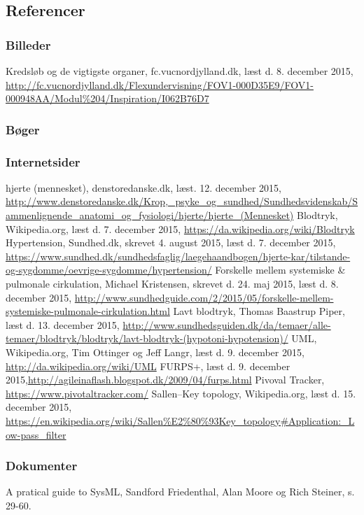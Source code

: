 \begin{thebibliography}{99}
\section{Referencer}
\subsubsection{Billeder}
Kredsløb og de vigtigste organer, fc.vucnordjylland.dk, læst d. 8. december 2015, \url{http://fc.vucnordjylland.dk/Flexundervisning/FOV1-000D35E9/FOV1-000948AA/Modul\%204/Inspiration/I062B76D7}
\subsubsection{Bøger}

\subsubsection{Internetsider}
hjerte (mennesket), denstoredanske.dk, læst. 12. december 2015, \url{http://www.denstoredanske.dk/Krop,_psyke_og_sundhed/Sundhedsvidenskab/Sammenlignende_anatomi_og_fysiologi/hjerte/hjerte_(Mennesket)}
Blodtryk, Wikipedia.org, læst d. 7. december 2015, \url{https://da.wikipedia.org/wiki/Blodtryk}
Hypertension, Sundhed.dk, skrevet 4. august 2015, læst d. 7. december 2015,
\url{https://www.sundhed.dk/sundhedsfaglig/laegehaandbogen/hjerte-kar/tilstande-og-sygdomme/oevrige-sygdomme/hypertension/}
Forskelle mellem systemiske \& pulmonale cirkulation, Michael Kristensen, skrevet d. 24. maj 2015, læst d. 8. december 2015, \url{http://www.sundhedguide.com/2/2015/05/forskelle-mellem-systemiske-pulmonale-cirkulation.html}
Lavt blodtryk, Thomas Baastrup Piper, læst d. 13. december 2015, \url{http://www.sundhedsguiden.dk/da/temaer/alle-temaer/blodtryk/blodtryk/lavt-blodtryk-(hypotoni-hypotension)/}
UML, Wikipedia.org, Tim Ottinger og Jeff Langr, læst d. 9. december 2015, \url{http://da.wikipedia.org/wiki/UML}
FURPS+, læst d. 9. december 2015,\url{http://agileinaflash.blogspot.dk/2009/04/furps.html}
Pivoval Tracker, \url{https://www.pivotaltracker.com/}
Sallen–Key topology, Wikipedia.org, læst d. 15. december 2015, \url{https://en.wikipedia.org/wiki/Sallen\%E2\%80\%93Key_topology#Application:_Low-pass_filter}
\subsubsection{Dokumenter}
A pratical guide to SysML, Sandford Friedenthal, Alan Moore og Rich Steiner, s. 29-60.
\end{thebibliography}